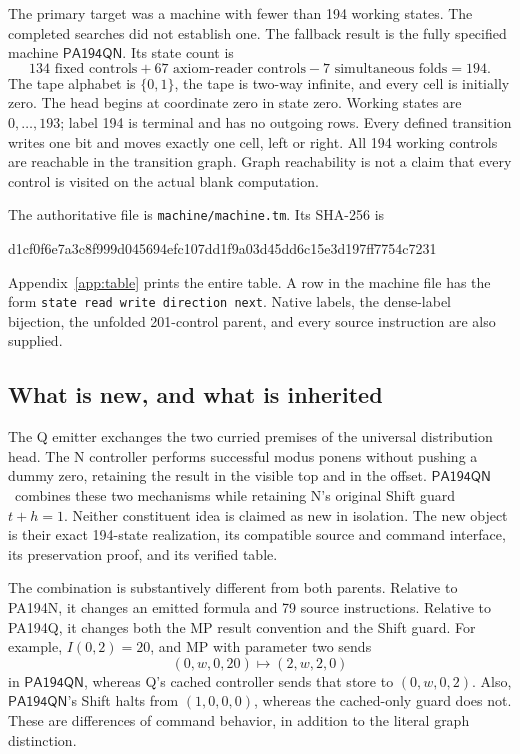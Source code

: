 \documentclass[11pt,letterpaper]{article}
\newcommand{\file}[1]{\nolinkurl{#1}}
\newcommand{\M}{\ensuremath{\mathsf{PA194QN}}}
\begin{document}
The primary target was a machine with fewer than 194 working states.
The completed searches did not establish one. The fallback result is the
fully specified machine \M. Its state count is
\[
134\text{ fixed controls}+67\text{ axiom-reader controls}
             -7\text{ simultaneous folds}=194.
\]
The tape alphabet is $\{0,1\}$, the tape is two-way infinite, and every cell
is initially zero. The head begins at coordinate zero in state zero.
Working states are $0,\ldots,193$; label 194 is terminal and has no outgoing
rows. Every defined transition writes one bit and moves exactly one cell,
left or right. All 194 working controls are reachable in the transition
graph. Graph reachability is not a claim that every control is visited on
the actual blank computation.

The authoritative file is \file{machine/machine.tm}. Its SHA-256 is
\begin{center}\small\ttfamily
d1cf0f6e7a3c8f999d045694efc107dd1f9a03d45dd6c15e3d197ff7754c7231
\end{center}
Appendix~\ref{app:table} prints the entire table. A row in the machine file
has the form \texttt{state read write direction next}. Native labels,
the dense-label bijection, the unfolded 201-control parent, and every
source instruction are also supplied.

\subsection{What is new, and what is inherited}

The Q emitter\cite{q} exchanges the two curried premises of the universal
distribution head. The N controller performs successful modus ponens without
pushing a dummy zero, retaining the result in the visible top and in the
offset\cite{n}. \M\ combines these two mechanisms while retaining N's original
Shift guard $t+h=1$. Neither constituent idea is claimed as new in isolation.
The new object is their exact 194-state realization, its compatible source
and command interface, its preservation proof, and its verified table.

The combination is substantively different from both parents. Relative to
PA194N, it changes an emitted formula and 79 source instructions. Relative
to PA194Q, it changes both the MP result convention and the Shift guard.
For example, $I(0,2)=20$, and MP with parameter two sends
\[
(0,w,0,20)\longmapsto(2,w,2,0)
\]
in \M, whereas Q's cached controller sends that store to $(0,w,0,2)$.
Also, \M's Shift halts from $(1,0,0,0)$, whereas the cached-only guard
does not. These are differences of command behavior, in addition to the
literal graph distinction.
\end{document}
